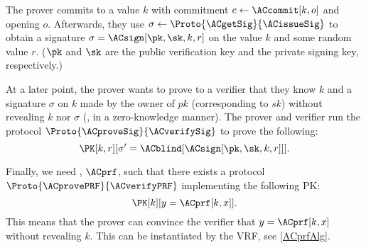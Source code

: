 
The prover commits to a value \(k\) with commitment \(c\gets \ACcommit[k, o]\) 
and opening \(o\).
Afterwards, they use \(\sigma\gets \Proto{\ACgetSig}{\ACissueSig}\) to obtain a 
signature \(\sigma = \ACsign[\pk, \sk, k, r]\) on the value \(k\) and some 
random value \(r\).
(\(\pk\) and \(\sk\) are the public verification key and the private signing 
key, respectively.)

At a later point, the prover wants to prove to a verifier that they know \(k\) and a signature \(\sigma\) on \(k\) made by the owner of \(pk\) (corresponding to \(sk\)) without revealing \(k\) nor \(\sigma\) (\ie, in a zero-knowledge manner).
The prover and verifier run the protocol \(\Proto{\ACproveSig}{\ACverifySig}\) 
to prove the following:
\begin{equation*}
  \PK[k, r][\sigma' = \ACblind[\ACsign[\pk, \sk, k, r]]].
\end{equation*}

Finally, we need , \(\ACprf\), such that there exists a protocol 
\(\Proto{\ACprovePRF}{\ACverifyPRF}\) implementing the following \ac{PK}:
\begin{equation*}
  \PK[k][y = \ACprf[k, x]].
\end{equation*}
This means that the prover can convince the verifier that \(y = \ACprf[k, x]\) 
without revealing \(k\).
This can be instantiated by the \textcite{DY-VRF} \ac{VRF}, see 
\cref{ACprfAlg}.



